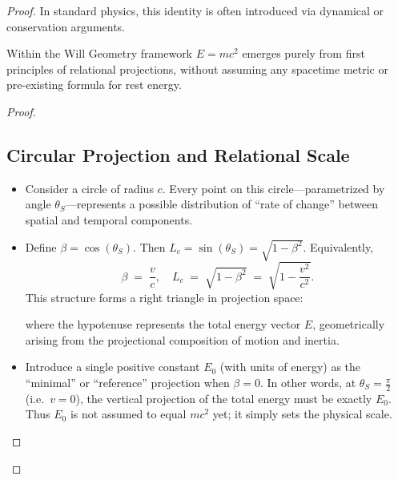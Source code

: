 \documentclass{article}
\begin{document}
\begin{proof}
In standard physics, this identity is often introduced via dynamical or conservation arguments.

\begin{theorem}
Within the Will Geometry framework \(E = mc^2\) emerges purely from first principles of relational projections, without assuming any spacetime metric or pre-existing formula for rest energy.

\end{theorem}
\begin{proof}

\subsection*{Circular Projection and Relational Scale}

\begin{itemize}
    \item Consider a circle of radius \(c\).  Every point on this circle—parametrized by angle \(\theta_S\)—represents a possible distribution of “rate of change” between spatial and temporal components.
    \item Define \(\beta = \cos(\theta_S)\).  Then \(L_c=\sin(\theta_S) = \sqrt{1 - \beta^2}\).  Equivalently,
    \[
      \beta \;=\; \frac{v}{c}, 
      \quad 
      L_c \;=\;\sqrt{1 - \beta^2} \;=\; \sqrt{1 - \frac{v^2}{c^2}}.
    \]
This structure forms a right triangle in projection space:


\noindent where the hypotenuse represents the total energy vector \( E \), geometrically arising from the projectional composition of motion and inertia.

    \item Introduce a single positive constant \(E_0\) (with units of energy) as the “minimal” or “reference” projection when \(\beta = 0\).  In other words, at \(\theta_S = \tfrac{\pi}{2}\) (i.e.\ \(v=0\)), the vertical projection of the total energy must be exactly \(E_0\).  Thus \(E_0\) is not assumed to equal \(mc^2\) yet; it simply sets the physical scale.
\end{itemize}


\end{proof}
\end{proof}
\end{document}
